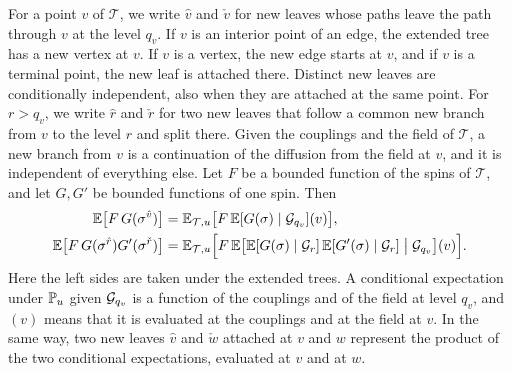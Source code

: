 For a point $v$ of $\mathcal T$, we write $\hat v$ and $\check v$ for new
leaves whose paths leave the path through $v$ at the level $q_v$. If $v$
is an interior point of an edge, the extended tree has a new vertex at
$v$. If $v$ is a vertex, the new edge starts at $v$, and if $v$ is a
terminal point, the new leaf is attached there. Distinct new leaves are
conditionally independent, also when they are attached at the same
point. For $r>q_v$, we write $\hat r$ and $\check r$ for two new leaves
that follow a common new branch from $v$ to the level $r$ and split
there. Given the couplings and the field of $\mathcal T$, a new branch
from $v$ is a continuation of the diffusion from the field at $v$, and it
is independent of everything else. Let $F$ be a bounded function of the
spins of $\mathcal T$, and let $G,G'$ be bounded functions of one spin.
Then
\begin{equation}\label{eq:tree-replacement}
 \begin{aligned}
 \mathbb E\bigl[F\,G(\sigma^{\hat v})\bigr]
 &=\mathbb E_{\mathcal T,u}\bigl[F\,\mathbb E[G(\sigma)\mid\mathcal G_{q_v}](v)\bigr],\\
 \mathbb E\bigl[F\,G(\sigma^{\hat r})G'(\sigma^{\check r})\bigr]
 &=\mathbb E_{\mathcal T,u}\Bigl[F\,\mathbb E\bigl[\mathbb E[G(\sigma)\mid\mathcal G_r]\,
   \mathbb E[G'(\sigma)\mid\mathcal G_r]\bigm|\mathcal G_{q_v}\bigr](v)\Bigr].
 \end{aligned}
\end{equation}
Here the left sides are taken under the extended trees. A conditional
expectation under $\mathbb P_u$ given $\mathcal G_{q_v}$ is a function of the
couplings and of the field at level $q_v$, and $(v)$ means that it is
evaluated at the couplings and at the field at $v$. In the same way, two
new leaves $\hat v$ and $\check w$ attached at $v$ and $w$ represent the
product of the two conditional expectations, evaluated at $v$ and at $w$.

